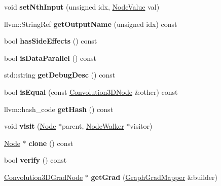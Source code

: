 \begin{DoxyCompactItemize}
void {\bfseries set\+Nth\+Input} (unsigned idx, \hyperlink{structglow_1_1_node_value}{Node\+Value} val)
\item 
\mbox{\label{classglow_1_1_convolution3_d_node_a1f353b4ba1a4a36de17de5130f7d7623}} 
llvm\+::\+String\+Ref {\bfseries get\+Output\+Name} (unsigned idx) const
\item 
\mbox{\label{classglow_1_1_convolution3_d_node_a57d9ced02239ec4d26884f159db7cd45}} 
bool {\bfseries has\+Side\+Effects} () const
\item 
\mbox{\label{classglow_1_1_convolution3_d_node_a49771cf5589171c0cca3309d726a25a9}} 
bool {\bfseries is\+Data\+Parallel} () const
\item 
\mbox{\label{classglow_1_1_convolution3_d_node_a047b9e3d7f1226d324a4a02246d17689}} 
std\+::string {\bfseries get\+Debug\+Desc} () const
\item 
\mbox{\label{classglow_1_1_convolution3_d_node_ab596e9a075661b2245d3fce5466e9133}} 
bool {\bfseries is\+Equal} (const \hyperlink{classglow_1_1_convolution3_d_node}{Convolution3\+D\+Node} \&other) const
\item 
\mbox{\label{classglow_1_1_convolution3_d_node_a5147f7dc8a51d5ff863e393c38f4cac2}} 
llvm\+::hash\+\_\+code {\bfseries get\+Hash} () const
\item 
\mbox{\label{classglow_1_1_convolution3_d_node_ae79d4e456a3ac36282682191d326c680}} 
void {\bfseries visit} (\hyperlink{classglow_1_1_node}{Node} $\ast$parent, \hyperlink{classglow_1_1_node_walker}{Node\+Walker} $\ast$visitor)
\item 
\mbox{\label{classglow_1_1_convolution3_d_node_a15c652aa60509e2971d5277cbdd07d89}} 
\hyperlink{classglow_1_1_node}{Node} $\ast$ {\bfseries clone} () const
\item 
\mbox{\label{classglow_1_1_convolution3_d_node_aa0db3bea9c741fcf0f3b4f97ad19104f}} 
bool {\bfseries verify} () const
\item 
\mbox{\label{classglow_1_1_convolution3_d_node_a6216697aaf8ffae977d07e9fe1352d84}} 
\hyperlink{classglow_1_1_convolution3_d_grad_node}{Convolution3\+D\+Grad\+Node} $\ast$ {\bfseries get\+Grad} (\hyperlink{classglow_1_1_graph_grad_mapper}{Graph\+Grad\+Mapper} \&builder)
\end{DoxyCompactItemize}
